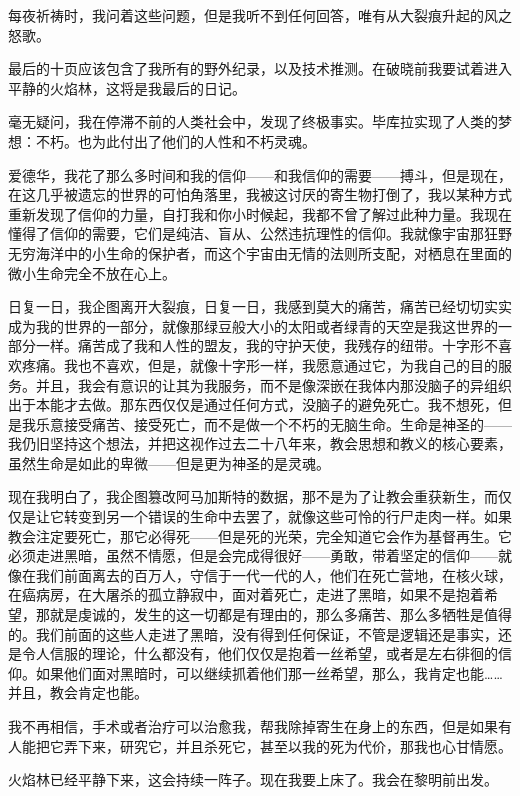 \documentclass[AutoFakeBold=true]{book}
\begin{document}
每夜祈祷时，我问着这些问题，但是我听不到任何回答，唯有从大裂痕升起的风之怒歌。

\vspace*{1em}{\kaishu 第二百一十四日：}

最后的十页应该包含了我所有的野外纪录，以及技术推测。在破晓前我要试着进入平静的火焰林，这将是我最后的日记。

毫无疑问，我在停滞不前的人类社会中，发现了终极事实。毕库拉实现了人类的梦想：不朽。也为此付出了他们的人性和不朽灵魂。

爱德华，我花了那么多时间和我的信仰——和我信仰的需要——搏斗，但是现在，在这几乎被遗忘的世界的可怕角落里，我被这讨厌的寄生物打倒了，我以某种方式重新发现了信仰的力量，自打我和你小时候起，我都不曾了解过此种力量。我现在懂得了信仰的需要，它们是纯洁、盲从、公然违抗理性的信仰。我就像宇宙那狂野无穷海洋中的小生命的保护者，而这个宇宙由无情的法则所支配，对栖息在里面的微小生命完全不放在心上。

日复一日，我企图离开大裂痕，日复一日，我感到莫大的痛苦，痛苦已经切切实实成为我的世界的一部分，就像那绿豆般大小的太阳或者绿青的天空是我这世界的一部分一样。痛苦成了我和人性的盟友，我的守护天使，我残存的纽带。十字形不喜欢疼痛。我也不喜欢，但是，就像十字形一样，我愿意通过它，为我自己的目的服务。并且，我会有意识的让其为我服务，而不是像深嵌在我体内那没脑子的异组织出于本能才去做。那东西仅仅是通过任何方式，没脑子的避免死亡。我不想死，但是我乐意接受痛苦、接受死亡，而不是做一个不朽的无脑生命。生命是神圣的——我仍旧坚持这个想法，并把这视作过去二十八年来，教会思想和教义的核心要素，虽然生命是如此的卑微——但是更为神圣的是灵魂。

现在我明白了，我企图篡改阿马加斯特的数据，那不是为了让教会重获新生，而仅仅是让它转变到另一个错误的生命中去罢了，就像这些可怜的行尸走肉一样。如果教会注定要死亡，那它必得死——但是死的光荣，完全知道它会作为基督再生。它必须走进黑暗，虽然不情愿，但是会完成得很好——勇敢，带着坚定的信仰——就像在我们前面离去的百万人，守信于一代一代的人，他们在死亡营地，在核火球，在癌病房，在大屠杀的孤立静寂中，面对着死亡，走进了黑暗，如果不是抱着希望，那就是虔诚的，发生的这一切都是有理由的，那么多痛苦、那么多牺牲是值得的。我们前面的这些人走进了黑暗，没有得到任何保证，不管是逻辑还是事实，还是令人信服的理论，什么都没有，他们仅仅是抱着一丝希望，或者是左右徘徊的信仰。如果他们面对黑暗时，可以继续抓着他们那一丝希望，那么，我肯定也能……并且，教会肯定也能。

我不再相信，手术或者治疗可以治愈我，帮我除掉寄生在身上的东西，但是如果有人能把它弄下来，研究它，并且杀死它，甚至以我的死为代价，那我也心甘情愿。

火焰林已经平静下来，这会持续一阵子。现在我要上床了。我会在黎明前出发。
\end{document}
